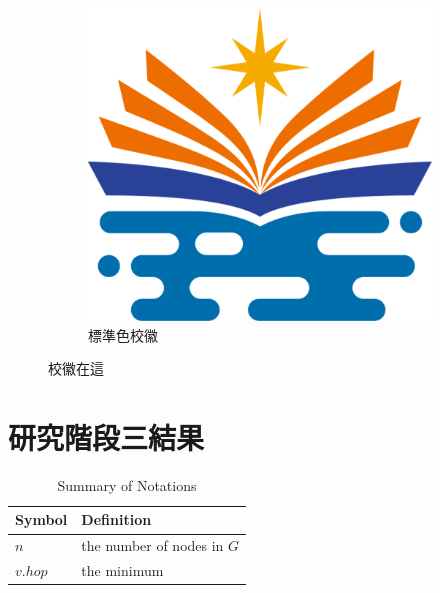 \begin{figure}
\begin{subfigure}{0.4\textwidth}
        \includegraphics[width=\textwidth]{./figures/seal/seal_standard.png}
        \caption{標準色校徽}
    \end{subfigure}
    \caption{校徽在這}
\end{figure}

\section{研究階段三結果}

\begin{table} [!h]
    \centering
    \centering \caption{Summary of Notations}
    \begin{tabular}{|p{1.5cm}|p{6.5cm}|} \hline
        Symbol  & Definition
        \\ \hline
        $n$     & the number of nodes in $G$
        \\ \hline
        $v.hop$ & the minimum
        \\ \hline
    \end{tabular}\label{table:notation}

\end{table}

